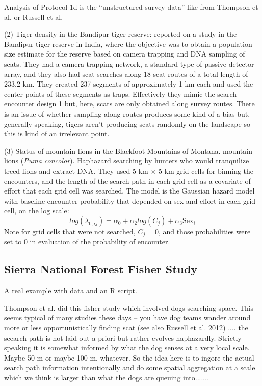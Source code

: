 Analysis of Protocol 1d is the ``unstructured survey data'' like
from Thompson et al. or Russell et al. 

(2) Tiger density in the Bandipur tiger reserve:
\citet{gopalaswamy_etal:2012ecol} reported on a study in the Bandipur
tiger reserve in India, where the objective was to obtain a population
size estimate for the reserve based on camera trapping and DNA
sampling of scats.  They had a camera trapping network, a standard
type of passive detector array, and they also had scat searches along
18 scat routes of a total length of 233.2 km. They created 237
segments of approximately 1 km each and used the center points of
these segments as traps. Effectively they mimic the search encounter
design 1 but, here, scats are only obtained along survey routes.
There is an issue of whether sampling along routes produces some kind
of a bias but, generally speaking, tigers aren't producing scats
randomly on the landscape so this is kind of an irrelevant point.



(3) Status of mountain lions in the Blackfoot Mountains of  Montana.
\citet{russell_etal:2012} mountain lions ({\it Puma
  concolor}). Haphazard searching by hunters who would tranquilize
treed lions and extract DNA.
They used 5 km $\times$ 5 km grid cells for binning the encounters,
and the length of the search path in each grid cell as a covariate of
effort that each grid cell was searched.
The model is the Gaussian hazard model with baseline encounter
probability that depended on sex and effort in each grid cell, on the
log scale:
\[
 log(\lambda_{0,ij}) =
\alpha_{0} + \alpha_{2} log(C_{j}) + \alpha_{3} \mbox{Sex}_{i}
\]
Note for grid cells that were not searched, $C_{j} =0$, and those
probabilities were set to 0 in evaluation of the probability of
encounter.







\subsection{Sierra National Forest Fisher Study}

A real example with data and an R script. 

Thompson et al. did this fisher study which involved dogs searching
space. This seems typical of many
studies these days -- you have dog teams wander around more or less
opportunistically finding scat
(see also Russell et al. 2012) .... the seearch path is not laid out a
priori but rather evolves haphazardly.  Strictly speaking it is
somewhat informed by what the dog senses at a very local scale. Maybe
50 m or maybe 100 m, whatever.
So the idea here is to ingore the actual search path information
intentionally and do some spatial aggregation at a scale which we
think is larger than what the dogs are queuing into.......

